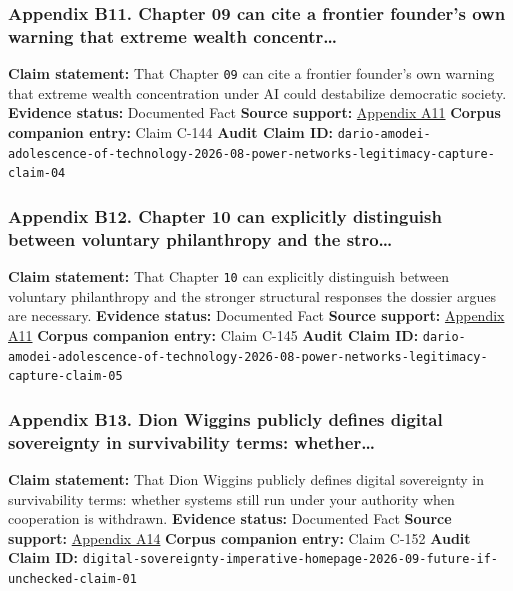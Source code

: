 \documentclass[
  american,
  11pt,
  letterpaper,
]{article}
\begin{document}
\subsubsection{Appendix B11. Chapter 09 can cite a frontier founder's
own warning that extreme wealth
concentr\ldots{}}\label{appendix-b11-chapter-09-can-cite-a-frontier-founder-s-own-warning-that-extreme-wealth-concentr}

\textbf{Claim statement:} That Chapter \texttt{09} can cite a frontier
founder's own warning that extreme wealth concentration under AI could
destabilize democratic society. \textbf{Evidence status:} Documented
Fact \textbf{Source support:}
\hyperref[appendix-a11-the-adolescence-of-technology]{Appendix A11}
\textbf{Corpus companion entry:} Claim C-144 \textbf{Audit Claim ID:}
\texttt{dario-amodei-adolescence-of-technology-2026-08-power-networks-legitimacy-capture-claim-04}

\subsubsection{Appendix B12. Chapter 10 can explicitly distinguish
between voluntary philanthropy and the
stro\ldots{}}\label{appendix-b12-chapter-10-can-explicitly-distinguish-between-voluntary-philanthropy-and-the-stro}

\textbf{Claim statement:} That Chapter \texttt{10} can explicitly
distinguish between voluntary philanthropy and the stronger structural
responses the dossier argues are necessary. \textbf{Evidence status:}
Documented Fact \textbf{Source support:}
\hyperref[appendix-a11-the-adolescence-of-technology]{Appendix A11}
\textbf{Corpus companion entry:} Claim C-145 \textbf{Audit Claim ID:}
\texttt{dario-amodei-adolescence-of-technology-2026-08-power-networks-legitimacy-capture-claim-05}

\subsubsection{Appendix B13. Dion Wiggins publicly defines digital
sovereignty in survivability terms:
whether\ldots{}}\label{appendix-b13-dion-wiggins-publicly-defines-digital-sovereignty-in-survivability-terms-whether}

\textbf{Claim statement:} That Dion Wiggins publicly defines digital
sovereignty in survivability terms: whether systems still run under your
authority when cooperation is withdrawn. \textbf{Evidence status:}
Documented Fact \textbf{Source support:}
\hyperref[appendix-a14-the-digital-sovereignty-imperative]{Appendix A14}
\textbf{Corpus companion entry:} Claim C-152 \textbf{Audit Claim ID:}
\texttt{digital-sovereignty-imperative-homepage-2026-09-future-if-unchecked-claim-01}
\end{document}
